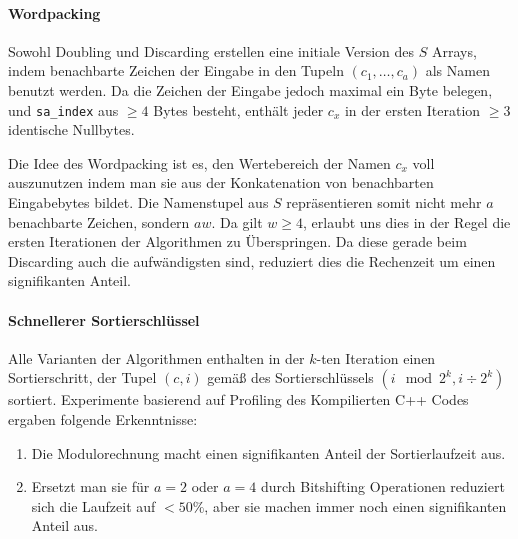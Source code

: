 \begin{figure}
\end{figure}

\paragraph{Wordpacking}

Sowohl Doubling und Discarding erstellen eine initiale Version des $S$ Arrays, indem benachbarte Zeichen der Eingabe in den Tupeln $(c_1, \dots, c_a)$ als Namen benutzt werden. Da die Zeichen der Eingabe jedoch maximal ein Byte belegen, und \texttt{sa\_index} aus $\ge 4$ Bytes besteht, enthält jeder $c_x$ in der ersten Iteration $\ge 3$ identische Nullbytes.

Die Idee des Wordpacking ist es, den Wertebereich der Namen $c_x$ voll auszunutzen indem man sie aus der Konkatenation von benachbarten Eingabebytes bildet. Die Namenstupel aus $S$ repräsentieren somit nicht mehr $a$ benachbarte Zeichen, sondern $aw$. Da gilt $w \ge 4$, erlaubt uns dies in der Regel die ersten Iterationen der Algorithmen zu Überspringen. Da diese gerade beim Discarding auch die aufwändigsten sind, reduziert dies die Rechenzeit um einen signifikanten Anteil.

\paragraph{Schnellerer Sortierschlüssel}

Alle Varianten der Algorithmen enthalten in der $k$-ten Iteration einen Sortierschritt, der Tupel $(c, i)$ gemäß des Sortierschlüssels $(i \mod 2^k, i \div 2^k)$ sortiert. Experimente basierend auf Profiling des Kompilierten C++ Codes ergaben folgende Erkenntnisse:

\begin{enumerate}
\item Die Modulorechnung macht einen signifikanten Anteil der Sortierlaufzeit aus.
\item Ersetzt man sie für $a = 2$ oder $a = 4$ durch Bitshifting Operationen reduziert sich die Laufzeit auf $< 50\%$, aber sie machen immer noch einen signifikanten Anteil aus.
\end{enumerate}

